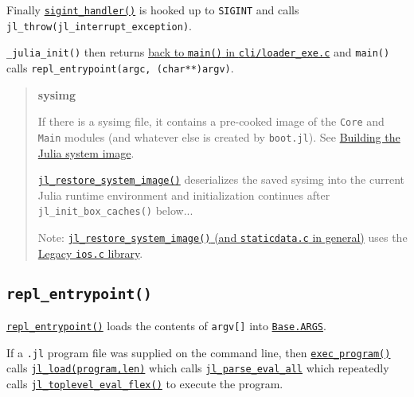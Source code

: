 Finally \href{https://github.com/JuliaLang/julia/blob/master/src/signals-unix.c}{\texttt{sigint\_handler()}} is hooked up to \texttt{SIGINT} and calls \texttt{jl\_throw(jl\_interrupt\_exception)}.



\texttt{\_julia\_init()} then returns \href{https://github.com/JuliaLang/julia/blob/master/cli/loader\_exe.c}{back to \texttt{main()} in \texttt{cli/loader\_exe.c}} and \texttt{main()} calls \texttt{repl\_entrypoint(argc, (char**)argv)}.



\begin{quote}
\textbf{sysimg}

If there is a sysimg file, it contains a pre-cooked image of the \texttt{Core} and \texttt{Main} modules (and whatever else is created by \texttt{boot.jl}). See \hyperlink{15513456349900674098}{Building the Julia system image}.

\href{https://github.com/JuliaLang/julia/blob/master/src/staticdata.c}{\texttt{jl\_restore\_system\_image()}} deserializes the saved sysimg into the current Julia runtime environment and initialization continues after \texttt{jl\_init\_box\_caches()} below...

Note: \href{https://github.com/JuliaLang/julia/blob/master/src/staticdata.c}{\texttt{jl\_restore\_system\_image()} (and \texttt{staticdata.c} in general)} uses the \hyperlink{3841537160196121279}{Legacy \texttt{ios.c} library}.

\end{quote}


\hypertarget{11153303243704616360}{}


\subsection{\texttt{repl\_entrypoint()}}



\href{https://github.com/JuliaLang/julia/blob/master/src/jlapi.c}{\texttt{repl\_entrypoint()}} loads the contents of \texttt{argv[]} into \hyperlink{2567473177880607455}{\texttt{Base.ARGS}}.



If a \texttt{.jl} {\textquotedbl}program{\textquotedbl} file was supplied on the command line, then \href{https://github.com/JuliaLang/julia/blob/master/src/jlapi.c}{\texttt{exec\_program()}} calls \href{https://github.com/JuliaLang/julia/blob/master/src/toplevel.c}{\texttt{jl\_load(program,len)}} which calls \href{https://github.com/JuliaLang/julia/blob/master/src/ast.c}{\texttt{jl\_parse\_eval\_all}} which repeatedly calls \href{https://github.com/JuliaLang/julia/blob/master/src/toplevel.c}{\texttt{jl\_toplevel\_eval\_flex()}} to execute the program.



